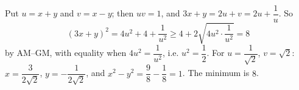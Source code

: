 Put $u=x+y$ and $v=x-y$; then $uv=1$, and $3x+y=2u+v=2u+\dfrac1u$. So
\[(3x+y)^2=4u^2+4+\dfrac{1}{u^2}\ge4+2\sqrt{4u^2\cdot\dfrac1{u^2}}=8\]
by AM--GM, with equality when $4u^2=\dfrac1{u^2}$, i.e. $u^2=\dfrac12$. For $u=\dfrac{1}{\sqrt2}$, $v=\sqrt2$: $x=\dfrac{3}{2\sqrt2}$, $y=-\dfrac{1}{2\sqrt2}$, and $x^2-y^2=\dfrac98-\dfrac18=1$. The minimum is $\boxed{8}$.
